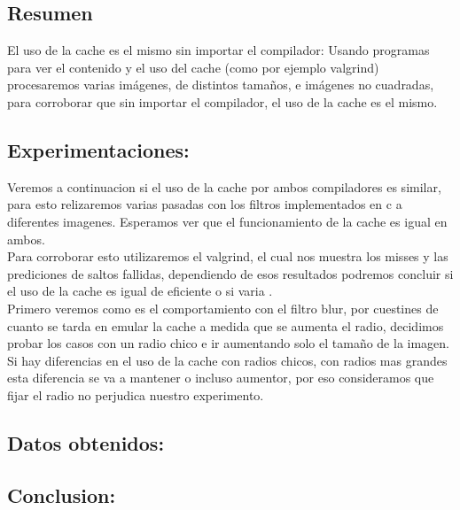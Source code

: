 \subsection{Resumen}

El uso de la cache es el mismo sin importar el compilador: Usando programas para ver el contenido y el uso del cache (como por ejemplo valgrind) procesaremos varias imágenes, de distintos tamaños, e imágenes no cuadradas, para corroborar que sin importar el compilador, el uso de la cache es el mismo. \\


\subsection{Experimentaciones:}

Veremos a continuacion si el uso de la cache por ambos compiladores es similar, para esto relizaremos varias pasadas con los filtros implementados en c a diferentes imagenes. Esperamos ver que el funcionamiento de la cache es igual en ambos. \\

Para corroborar esto utilizaremos el valgrind, el cual nos muestra los misses y las  prediciones de saltos fallidas, dependiendo de esos resultados podremos concluir si el uso de la cache es igual de eficiente o si varia . \\

Primero veremos como es el comportamiento con el filtro blur, por cuestines de cuanto se tarda en emular la cache a medida que se aumenta el radio, decidimos probar los casos con un radio chico e ir aumentando solo el tamaño de la imagen. Si hay diferencias en el uso de la cache con radios chicos, con radios mas grandes esta diferencia se va a mantener o incluso aumentor, por eso consideramos que fijar el radio no perjudica nuestro experimento. \\

\subsection{Datos obtenidos:}



\subsection{Conclusion:}

